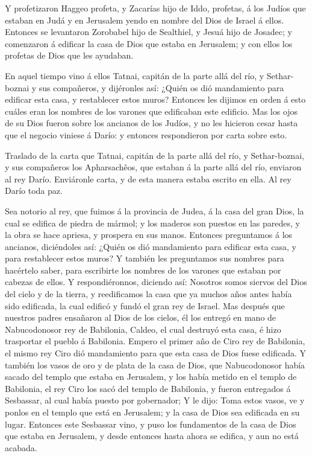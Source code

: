  Y profetizaron Haggeo profeta, y Zacarías hijo de Iddo,
profetas, á los Judíos que estaban en Judá y en Jerusalem yendo en
nombre del Dios de Israel á ellos.  Entonces se levantaron
Zorobabel hijo de Sealthiel, y Jesuá hijo de Josadec; y comenzaron á
edificar la casa de Dios que estaba en Jerusalem; y con ellos los
profetas de Dios que les ayudaban.

 En aquel tiempo vino á ellos Tatnai, capitán de la parte
allá del río, y Sethar-boznai y sus compañeros, y dijéronles así: ¿Quién
os dió mandamiento para edificar esta casa, y restablecer estos muros?
 Entonces les dijimos en orden á esto cuáles eran los
nombres de los varones que edificaban este edificio.  Mas
los ojos de su Dios fueron sobre los ancianos de los Judíos, y no les
hicieron cesar hasta que el negocio viniese á Darío: y entonces
respondieron por carta sobre esto.

 Traslado de la carta que Tatnai, capitán de la parte allá
del río, y Sethar-boznai, y sus compañeros los Apharsachêos, que estaban
á la parte allá del río, enviaron al rey Darío.  Enviáronle
carta, y de esta manera estaba escrito en ella. Al rey Darío toda paz.

 Sea notorio al rey, que fuimos á la provincia de Judea, á
la casa del gran Dios, la cual se edifica de piedra de mármol; y los
maderos son puestos en las paredes, y la obra se hace apriesa, y
prospera en sus manos.  Entonces preguntamos á los ancianos,
diciéndoles así: ¿Quién os dió mandamiento para edificar esta casa, y
para restablecer estos muros?  Y también les preguntamos
sus nombres para hacértelo saber, para escribirte los nombres de los
varones que estaban por cabezas de ellos.  Y
respondiéronnos, diciendo así: Nosotros somos siervos del Dios del cielo
y de la tierra, y reedificamos la casa que ya muchos años antes había
sido edificada, la cual edificó y fundó el gran rey de Israel.
 Mas después que nuestros padres ensañaron al Dios de los
cielos, él los entregó en mano de Nabucodonosor rey de Babilonia,
Caldeo, el cual destruyó esta casa, é hizo trasportar el pueblo á
Babilonia.  Empero el primer año de Ciro rey de Babilonia,
el mismo rey Ciro dió mandamiento para que esta casa de Dios fuese
edificada.  Y también los vasos de oro y de plata de la
casa de Dios, que Nabucodonosor había sacado del templo que estaba en
Jerusalem, y los había metido en el templo de Babilonia, el rey Ciro los
sacó del templo de Babilonia, y fueron entregados á Sesbassar, al cual
había puesto por gobernador;  Y le dijo: Toma estos vasos,
ve y ponlos en el templo que está en Jerusalem; y la casa de Dios sea
edificada en su lugar.  Entonces este Sesbassar vino, y
puso los fundamentos de la casa de Dios que estaba en Jerusalem, y desde
entonces hasta ahora se edifica, y aun no está acabada.

